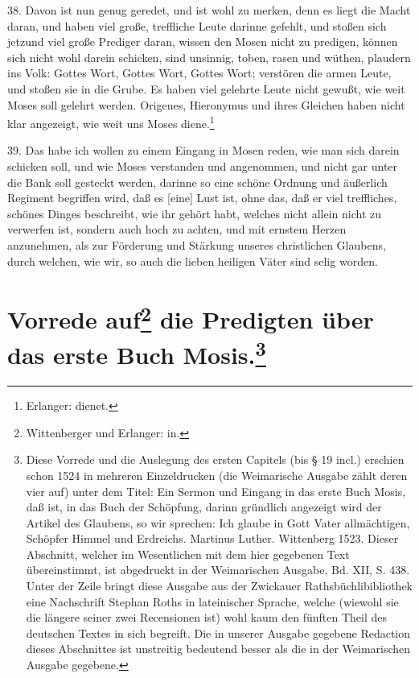 38. Davon ist nun genug geredet, und ist wohl zu merken, denn es liegt die Macht daran, und haben viel große, treffliche Leute darinne gefehlt, und stoßen sich jetzund viel große Prediger daran, wissen den Mosen nicht zu predigen, können sich nicht wohl darein schicken, sind unsinnig, toben, rasen und wüthen, plaudern ins Volk: Gottes Wort, Gottes Wort, Gottes Wort; verstören die armen Leute, und stoßen sie in die Grube. Es haben viel gelehrte Leute nicht gewußt, wie weit Moses soll gelehrt werden. Origenes, Hieronymus und ihres Gleichen haben nicht klar angezeigt, wie weit uns Moses diene.\footnote{Erlanger: dienet.}

39. Das habe ich wollen zu einem Eingang in Mosen reden, wie man sich darein schicken soll, und wie Moses verstanden und angenommen, und nicht gar unter die Bank soll gesteckt werden, darinne so eine schöne Ordnung und äußerlich Regiment begriffen wird, daß es [eine] Lust ist, ohne das, daß er viel treffliches, schönes Dinges beschreibt, wie ihr gehört habt, welches nicht allein nicht zu verwerfen ist, sondern auch hoch zu achten, und mit ernstem Herzen anzunehmen, als zur Förderung und Stärkung unseres christlichen Glaubens, durch welchen, wie wir, so auch die lieben heiligen Väter sind selig worden.

\section[Vorrede auf die Predigten über das erste Buch Mosis]{Vorrede auf\footnote{Wittenberger und Erlanger: in.} die Predigten über das erste Buch Mosis.\footnote{Diese Vorrede und die Auslegung des ersten Capitels (bis § 19 incl.) erschien schon 1524 in mehreren Einzeldrucken (die Weimarische Ausgabe zählt deren vier auf) unter dem Titel: Ein Sermon und Eingang in das erste Buch Mosis, daß ist, in das Buch der Schöpfung, darinn gründlich angezeigt wird der Artikel des Glaubens, so wir sprechen: Ich glaube in Gott Vater allmächtigen, Schöpfer Himmel und Erdreichs. Martinus Luther. Wittenberg 1523. Dieser Abschnitt, welcher im Wesentlichen mit dem hier gegebenen Text übereinstimmt, ist abgedruckt in der Weimarischen Ausgabe, Bd. XII, S. 438. Unter der Zeile bringt diese Ausgabe aus der Zwickauer Rathsbüchlibibliothek eine Nachschrift Stephan Roths in lateinischer Sprache, welche (wiewohl sie die längere seiner zwei Recensionen ist) wohl kaum den fünften Theil des deutschen Textes in sich begreift. Die in unserer Ausgabe gegebene Redaction dieses Abschnittes ist unstreitig bedeutend besser als die in der Weimarischen Ausgabe gegebene.}}

